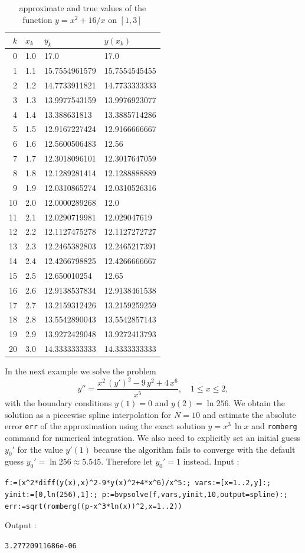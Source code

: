 \documentclass[a4paper,11pt]{book}
\begin{document}
\begin{table}
  \centering\small
  \begin{tabular}{|r|ll|l|}
    \hline
    $k$ & $x_k$ & $y_k$ & $y(x_k)$\\\hline
    0 & 1.0 & 17.0 & 17.0\\
    1 & 1.1 & 15.7554961579 & 15.7554545455\\
    2 & 1.2 & 14.7733911821 & 14.7733333333\\
    3 & 1.3 & 13.9977543159 & 13.9976923077\\
    4 & 1.4 & 13.388631813 & 13.3885714286\\
    5 & 1.5 & 12.9167227424 & 12.9166666667\\
    6 & 1.6 & 12.5600506483 & 12.56\\
    7 & 1.7 & 12.3018096101 & 12.3017647059\\
    8 & 1.8 & 12.1289281414 & 12.1288888889\\
    9 & 1.9 & 12.0310865274 & 12.0310526316\\
    10 & 2.0 & 12.0000289268 & 12.0\\
    11 & 2.1 & 12.0290719981 & 12.029047619\\
    12 & 2.2 & 12.1127475278 & 12.1127272727\\
    13 & 2.3 & 12.2465382803 & 12.2465217391\\
    14 & 2.4 & 12.4266798825 & 12.4266666667\\
    15 & 2.5 & 12.650010254 & 12.65\\
    16 & 2.6 & 12.9138537834 & 12.9138461538\\
    17 & 2.7 & 13.2159312426 & 13.2159259259\\
    18 & 2.8 & 13.5542890043 & 13.5542857143\\
    19 & 2.9 & 13.9272429048 & 13.9272413793\\
    20 & 3.0 & 14.3333333333 & 14.3333333333\\\hline
  \end{tabular}
  \caption{approximate and true values of the function $y=x^2+16/x$ on $[1,3]$\label{tab:bvp}}
\end{table}

In the next example we solve the problem
\[ y''=\frac{x^2\,(y')^2-9\,y^2+4\,x^6}{x^5},\quad 1\leq x\leq 2, \]
with the boundary conditions $y(1)=0$ and $y(2)=\ln 256$. We obtain the solution as a piecewise spline interpolation for $N=10$ and estimate the absolute error {\tt err} of the approximation using the exact solution $y=x^3\,\ln x$ and {\tt romberg} command for numerical integration. We also need to explicitly set an initial guess $y_0'$ for the value $y'(1)$ because the algorithm fails to converge with the default guess $y_0'=\ln 256\approx 5.545$. Therefore let $y_0'=1$ instead. Input :
\begin{center}
  \tt f:=(x\verb|^|2*diff(y(x),x)\verb|^|2-9*y(x)\verb|^|2+4*x\verb|^|6)/x\verb|^|5:; vars:=[x=1..2,y]:; yinit:=[0,ln(256),1]:; p:=bvpsolve(f,vars,yinit,10,output=spline):; err:=sqrt(romberg((p-x\verb|^|3*ln(x))\verb|^|2,x=1..2))
\end{center}
Output :
\begin{center}
  \tt 3.27720911686e-06
\end{center}
\end{document}
